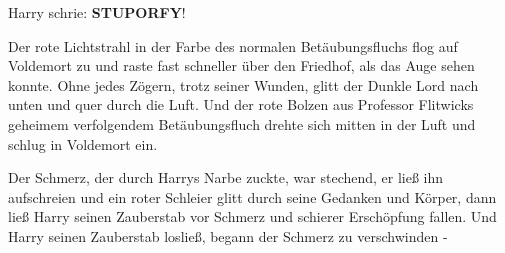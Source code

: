 Harry schrie: \glqq \textbf{STUPORFY}!\grqq{}

Der rote Lichtstrahl in der Farbe des normalen Betäubungsfluchs flog auf
Voldemort zu und raste fast schneller über den Friedhof, als das Auge sehen
konnte. Ohne jedes Zögern, trotz seiner Wunden, glitt der Dunkle Lord nach unten
und quer durch die Luft. Und der rote Bolzen aus Professor Flitwicks geheimem
verfolgendem Betäubungsfluch drehte sich mitten in der Luft und schlug in
Voldemort ein.

Der Schmerz, der durch Harrys Narbe zuckte, war stechend, er ließ ihn
aufschreien und ein roter Schleier glitt durch seine Gedanken und Körper, dann
ließ Harry seinen Zauberstab vor Schmerz und schierer Erschöpfung fallen. Und
Harry seinen Zauberstab losließ, begann der Schmerz zu verschwinden -

